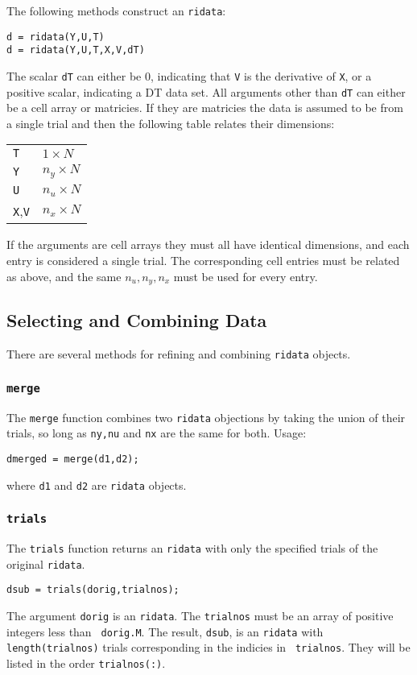\documentclass{article}
\begin{document}
The following methods construct an {\tt ridata}:
\begin{verbatim}
d = ridata(Y,U,T)
d = ridata(Y,U,T,X,V,dT)
\end{verbatim}
The scalar {\tt dT} can either be $0$, indicating that {\tt V} is the derivative of {\tt X}, or a positive scalar, indicating a DT data set.
All arguments other than {\tt dT} can either be a cell array or matricies.  If they are matricies the data is assumed to be from a single trial and  then the following table relates their dimensions:
\begin{center}
  \begin{tabular}{l|l}
  {\tt T} & $1 \times N$ \\
  {\tt Y} & $n_y \times N$ \\
  {\tt U} & $n_u \times N$ \\
  {\tt X},{\tt V} & $n_x \times N$
  \end{tabular}
\end{center}
If the arguments are cell arrays they must all have identical
dimensions, and each entry is considered a single trial.  The
corresponding cell entries must be related as above, and the same
$n_u,n_y,n_x$ must be used for every entry.
\subsection{Selecting and Combining Data}
There are several methods for refining and combining {\tt ridata}
objects.
\subsubsection{{\tt merge}}
The {\tt merge} function combines two {\tt ridata} objections by
taking the union of their trials, so long as {\tt ny,nu} and {\tt nx}
are the same for both. Usage:
\begin{verbatim}
dmerged = merge(d1,d2);
\end{verbatim}
where {\tt d1} and {\tt d2} are {\tt ridata} objects.

\subsubsection{{\tt trials}}
The {\tt trials} function returns an {\tt ridata} with only the
specified trials of the original {\tt ridata}.
\begin{verbatim}
dsub = trials(dorig,trialnos);
\end{verbatim}
The argument {\tt dorig} is an {\tt ridata}.  The {\tt trialnos} must
be an array of positive integers less than {\tt
  dorig.M}.  The result, {\tt dsub}, is an {\tt ridata} with {\tt
  length(trialnos)} trials corresponding in the indicies in {\tt
  trialnos}.  They will be listed in the order {\tt trialnos(:)}.
\end{document}

